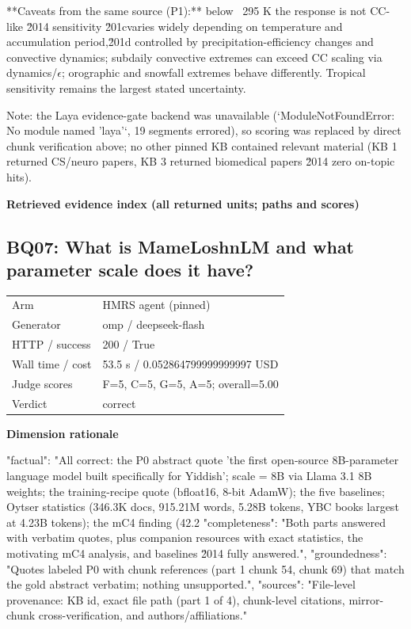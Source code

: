 \documentclass[10pt]{article}
\begin{document}
\begin{AnswerText}
**Caveats from the same source (P1):** below ~295 K the response is not CC-like \u2014 sensitivity \u201cvaries widely depending on temperature and accumulation period,\u201d controlled by precipitation-efficiency changes and convective dynamics; subdaily convective extremes can exceed CC scaling via dynamics/$\epsilon$; orographic and snowfall extremes behave differently. Tropical sensitivity remains the largest stated uncertainty.

Note: the Laya evidence-gate backend was unavailable (`ModuleNotFoundError: No module named 'laya'`, 19 segments errored), so scoring was replaced by direct chunk verification above; no other pinned KB contained relevant material (KB 1 returned CS/neuro papers, KB 3 returned biomedical papers \u2014 zero on-topic hits).
\end{AnswerText}

\textbf{Retrieved evidence index (all returned units; paths and scores) }
\begin{EvidenceText}
\end{EvidenceText}
\subsection{BQ07: What is MameLoshnLM and what parameter scale does it have?}
\begin{tabular}{@{}ll@{}}
Arm & HMRS agent (pinned)\\
Generator & omp / deepseek-flash\\
HTTP / success & 200 / True\\
Wall time / cost & 53.5 s / 0.052864799999999997 USD\\
Judge scores & F=5, C=5, G=5, A=5; overall=5.00\\
Verdict & correct\\
\end{tabular}

\textbf{Dimension rationale}
\begin{EvidenceText}
{
  "factual": "All correct: the P0 abstract quote 'the first open-source 8B-parameter language model built specifically for Yiddish'; scale = 8B via Llama 3.1 8B weights; the training-recipe quote (bfloat16, 8-bit AdamW); the five baselines; Oytser statistics (346.3K docs, 915.21M words, 5.28B tokens, YBC books largest at 4.23B tokens); the mC4 finding (42.2%
  "completeness": "Both parts answered with verbatim quotes, plus companion resources with exact statistics, the motivating mC4 analysis, and baselines \u2014 fully answered.",
  "groundedness": "Quotes labeled P0 with chunk references (part 1 chunk 54, chunk 69) that match the gold abstract verbatim; nothing unsupported.",
  "sources": "File-level provenance: KB id, exact file path (part 1 of 4), chunk-level citations, mirror-chunk cross-verification, and authors/affiliations."
}
\end{EvidenceText}
\end{document}
